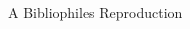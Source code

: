 \begin{titlepage}
    \begin{addmargin}[-1cm]{-3cm}
    \begin{center}
        \large

        \hfill

        \vfill

        \begingroup
            \color{Maroon} \\ \bigskip
        \endgroup


        \vfill


        A Bibliophiles Reproduction \\ \medskip

        \myTime

        \vfill                      

    \end{center}  
  \end{addmargin}       
\end{titlepage}   